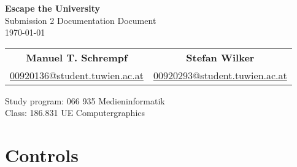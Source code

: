 \documentclass[12pt]{article}
\begin{document}
\begin{titlepage}
 \vspace*{8cm}
\begin{center}
 \textbf{\Huge Escape the University} \\
  \vspace{3mm}
 {\Large Submission 2 Documentation Document\\
  \vspace{3mm}
  \today}
 \vspace{5mm}
\begin{table}[h!]
  \centering
  \begin{tabular}{c c}
	\textbf{Manuel T. Schrempf}  &   \textbf{Stefan Wilker}\\
	\href{mailto:00920136@student.tuwien.ac.at}{00920136@student.tuwien.ac.at}&
	\href{mailto:00920293@student.tuwien.ac.at}{00920293@student.tuwien.ac.at}\\
  \end{tabular}
\end{table}

 \vspace{3mm}
{\large Study program: 066 935 Medieninformatik\\
 \vspace{2mm}
Class: 186.831 UE Computergraphics}
\end{center}
\end{titlepage}

\tableofcontents %

\thispagestyle{empty}
\newpage
\pagestyle{plain}
\setcounter{page}{1}

\section{Controls \label{Controls}}
\end{document}
